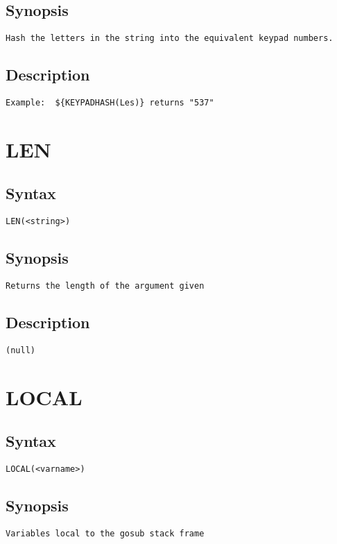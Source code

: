 \subsection{Synopsis}
\begin{verbatim}
Hash the letters in the string into the equivalent keypad numbers.
\end{verbatim}
\subsection{Description}
\begin{verbatim}
Example:  ${KEYPADHASH(Les)} returns "537"

\end{verbatim}


\section{LEN}
\subsection{Syntax}
\begin{verbatim}
LEN(<string>)
\end{verbatim}
\subsection{Synopsis}
\begin{verbatim}
Returns the length of the argument given
\end{verbatim}
\subsection{Description}
\begin{verbatim}
(null)
\end{verbatim}


\section{LOCAL}
\subsection{Syntax}
\begin{verbatim}
LOCAL(<varname>)
\end{verbatim}
\subsection{Synopsis}
\begin{verbatim}
Variables local to the gosub stack frame
\end{verbatim}

